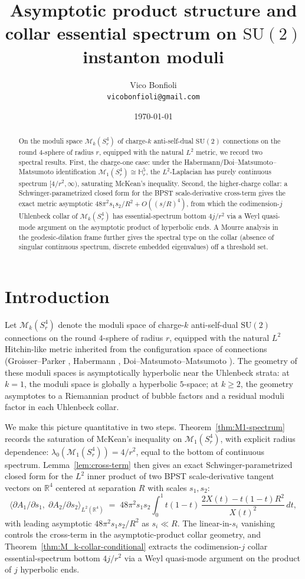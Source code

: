 \documentclass[11pt,letterpaper]{article}
\title{Asymptotic product structure and collar essential spectrum on $\mathrm{SU}(2)$ instanton moduli}
\author{Vico Bonfioli\\\small\texttt{vicobonfioli@gmail.com}}
\date{\today}
\theoremstyle{definition}
\newcommand{\bbR}{\mathbb{R}}
\newcommand{\bbH}{\mathbb{H}}
\newcommand{\cM}{\mathcal{M}}
\begin{document}
\maketitle

\begin{abstract}
On the moduli space $\cM_k(S^4_r)$ of charge-$k$ anti-self-dual $\mathrm{SU}(2)$ connections on the round $4$-sphere of radius $r$, equipped with the natural $L^2$ metric, we record two spectral results. First, the charge-one case: under the Habermann/Doi--Matsumoto--Matsumoto identification $\cM_1(S^4_r) \cong \bbH^5_r$, the $L^2$-Laplacian has purely continuous spectrum $[4/r^2, \infty)$, saturating McKean's inequality. Second, the higher-charge collar: a Schwinger-parametrized closed form for the BPST scale-derivative cross-term gives the exact metric asymptotic $48\pi^2 s_1 s_2/R^2 + O((s/R)^4)$, from which the codimension-$j$ Uhlenbeck collar of $\cM_k(S^4_r)$ has essential-spectrum bottom $4j/r^2$ via a Weyl quasi-mode argument on the asymptotic product of hyperbolic ends. A Mourre analysis in the geodesic-dilation frame further gives the spectral type on the collar (absence of singular continuous spectrum, discrete embedded eigenvalues) off a threshold set.
\end{abstract}

\section{Introduction}

Let $\cM_k(S^4_r)$ denote the moduli space of charge-$k$ anti-self-dual $\mathrm{SU}(2)$ connections on the round $4$-sphere of radius $r$, equipped with the natural $L^2$ Hitchin-like metric inherited from the configuration space of connections (Groisser--Parker \cite{GP1987,GP1989}, Habermann \cite{Habermann1993}, Doi--Matsumoto--Matsumoto \cite{DMM1987}). The geometry of these moduli spaces is asymptotically hyperbolic near the Uhlenbeck strata: at $k=1$, the moduli space is globally a hyperbolic $5$-space; at $k \ge 2$, the geometry asymptotes to a Riemannian product of bubble factors and a residual moduli factor in each Uhlenbeck collar.

We make this picture quantitative in two steps. Theorem~\ref{thm:M1-spectrum} records the saturation of McKean's inequality on $\cM_1(S^4_r)$, with explicit radius dependence: $\lambda_0(\cM_1(S^4_r)) = 4/r^2$, equal to the bottom of continuous spectrum. Lemma~\ref{lem:cross-term} then gives an exact Schwinger-parametrized closed form for the $L^2$ inner product of two BPST scale-derivative tangent vectors on $\bbR^4$ centered at separation $R$ with scales $s_1, s_2$:
\[
\langle \partial A_1/\partial s_1,\;\partial A_2/\partial s_2 \rangle_{L^2(\bbR^4)} \;=\; 48\pi^2 s_1 s_2 \int_0^1 t(1-t)\,\frac{2X(t) - t(1-t)R^2}{X(t)^2}\,dt,
\]
with leading asymptotic $48\pi^2 s_1 s_2/R^2$ as $s_i \ll R$. The linear-in-$s_i$ vanishing controls the cross-term in the asymptotic-product collar geometry, and Theorem~\ref{thm:M_k-collar-conditional} extracts the codimension-$j$ collar essential-spectrum bottom $4j/r^2$ via a Weyl quasi-mode argument on the product of $j$ hyperbolic ends.
\end{document}
